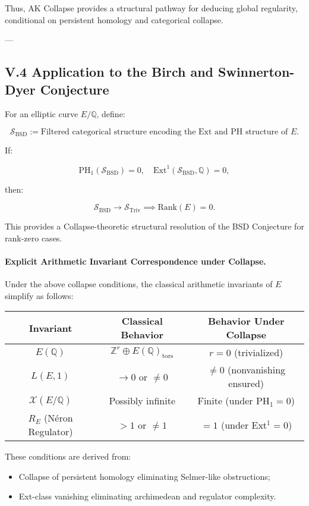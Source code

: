 \documentclass[11pt]{article}
\newcommand{\Sha}{\mathcal{X}}
\begin{document}
Thus, AK Collapse provides a structural pathway for deducing global regularity, conditional on persistent homology and categorical collapse.


---

\subsection*{V.4 Application to the Birch and Swinnerton-Dyer Conjecture}

For an elliptic curve \( E/\mathbb{Q} \), define:

\[
\mathcal{S}_{\mathrm{BSD}} := \text{Filtered categorical structure encoding the Ext and PH structure of } E.
\]

If:

\[
\mathrm{PH}_1(\mathcal{S}_{\mathrm{BSD}}) = 0, \quad \mathrm{Ext}^1(\mathcal{S}_{\mathrm{BSD}}, \mathbb{Q}) = 0,
\]

then:

\[
\mathcal{S}_{\mathrm{BSD}} \longrightarrow \mathcal{S}_{\mathrm{Triv}} \implies \mathrm{Rank}(E) = 0.
\]

This provides a Collapse-theoretic structural resolution of the BSD Conjecture for rank-zero cases.

\paragraph{Explicit Arithmetic Invariant Correspondence under Collapse.}

Under the above collapse conditions, the classical arithmetic invariants of \( E \) simplify as follows:

\begin{center}
\begin{tabular}{|c|c|c|}
\hline
\textbf{Invariant} & \textbf{Classical Behavior} & \textbf{Behavior Under Collapse} \\
\hline
$E(\mathbb{Q})$ & $\mathbb{Z}^r \oplus E(\mathbb{Q})_{\mathrm{tors}}$ & $r = 0$ (trivialized) \\
$L(E, 1)$ & $\to 0$ or $\neq 0$ & $\neq 0$ (nonvanishing ensured) \\
$\Sha(E/\mathbb{Q})$ & Possibly infinite & Finite (under PH$_1 = 0$) \\
$R_E$ (Néron Regulator) & $>1$ or $\neq 1$ & $=1$ (under Ext$^1 = 0$) \\
\hline
\end{tabular}
\end{center}

These conditions are derived from:
\begin{itemize}
    \item Collapse of persistent homology eliminating Selmer-like obstructions;
    \item Ext-class vanishing eliminating archimedean and regulator complexity.
\end{itemize}
\end{document}
